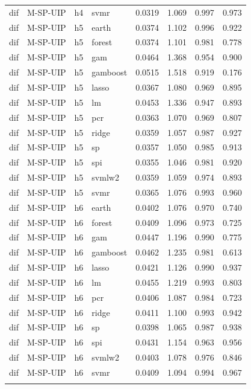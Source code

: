 \begin{ThreePartTable}
\begin{longtable}[t]{llclcccc}
dif & M-SP-UIP & h4 & svmr & 0.0319 & 1.069 & 0.997 & 0.973\\
\addlinespace
dif & M-SP-UIP & h5 & earth & 0.0374 & 1.102 & 0.996 & 0.922\\
dif & M-SP-UIP & h5 & forest & 0.0374 & 1.101 & 0.981 & 0.778\\
dif & M-SP-UIP & h5 & gam & 0.0464 & 1.368 & 0.954 & 0.900\\
dif & M-SP-UIP & h5 & gamboost & 0.0515 & 1.518 & 0.919 & 0.176\\
dif & M-SP-UIP & h5 & lasso & 0.0367 & 1.080 & 0.969 & 0.895\\
dif & M-SP-UIP & h5 & lm & 0.0453 & 1.336 & 0.947 & 0.893\\
dif & M-SP-UIP & h5 & pcr & 0.0363 & 1.070 & 0.969 & 0.807\\
dif & M-SP-UIP & h5 & ridge & 0.0359 & 1.057 & 0.987 & 0.927\\
dif & M-SP-UIP & h5 & sp & 0.0357 & 1.050 & 0.985 & 0.913\\
dif & M-SP-UIP & h5 & spi & 0.0355 & 1.046 & 0.981 & 0.920\\
dif & M-SP-UIP & h5 & svmlw2 & 0.0359 & 1.059 & 0.974 & 0.893\\
dif & M-SP-UIP & h5 & svmr & 0.0365 & 1.076 & 0.993 & 0.960\\
\addlinespace
dif & M-SP-UIP & h6 & earth & 0.0402 & 1.076 & 0.970 & 0.740\\
dif & M-SP-UIP & h6 & forest & 0.0409 & 1.096 & 0.973 & 0.725\\
dif & M-SP-UIP & h6 & gam & 0.0447 & 1.196 & 0.990 & 0.775\\
dif & M-SP-UIP & h6 & gamboost & 0.0462 & 1.235 & 0.981 & 0.613\\
dif & M-SP-UIP & h6 & lasso & 0.0421 & 1.126 & 0.990 & 0.937\\
dif & M-SP-UIP & h6 & lm & 0.0455 & 1.219 & 0.993 & 0.803\\
dif & M-SP-UIP & h6 & pcr & 0.0406 & 1.087 & 0.984 & 0.723\\
dif & M-SP-UIP & h6 & ridge & 0.0411 & 1.100 & 0.993 & 0.942\\
dif & M-SP-UIP & h6 & sp & 0.0398 & 1.065 & 0.987 & 0.938\\
dif & M-SP-UIP & h6 & spi & 0.0431 & 1.154 & 0.963 & 0.956\\
dif & M-SP-UIP & h6 & svmlw2 & 0.0403 & 1.078 & 0.976 & 0.846\\
dif & M-SP-UIP & h6 & svmr & 0.0409 & 1.094 & 0.994 & 0.967\\
\addlinespace

\end{longtable}
\end{ThreePartTable}
